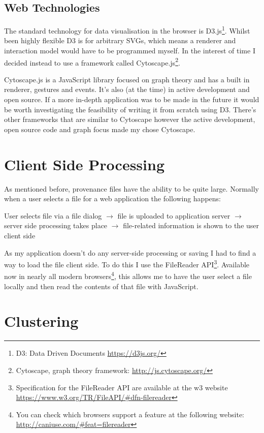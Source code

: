 \documentclass[BIT, graphvis, a4paper]{usydthesis}
\begin{document}
\subsection{Web Technologies}
\label{sub:web_technologies}

The standard technology for data visualisation in the browser is D3.js\footnote{D3: Data Driven Documents \url{https://d3js.org/}}. Whilst been highly flexible D3 is for arbitrary SVGs, which means a renderer and interaction model would have to be programmed myself. In the interest of time I decided instead to use a framework called Cytoscape.js\footnote{Cytoscape, graph theory framework: \url{http://js.cytoscape.org/}}. 

Cytoscape.js is a JavaScript library focused on graph theory and has a built in renderer, gestures and events. It's also (at the time) in active development and open source. If a more in-depth application was to be made in the future it would be worth investigating the feasibility of writing it from scratch using D3. There's other frameworks that are similar to Cytoscape however the active development, open source code and graph focus made my chose Cytoscape.

\section{Client Side Processing}
\label{sec:client_side_processing}

As mentioned before, provenance files have the ability to be quite large. Normally when a user selects a file for a web application the following happens:

User selects file via a file dialog $\rightarrow$ file is uploaded to application server $\rightarrow$ server side processing takes place $\rightarrow$ file-related information is shown to the user client side

As my application doesn't do any server-side processing or saving I had to find a way to load the file client side. To do this I use the FileReader API\footnote{Specification for the FileReader API are available at the w3 website \url{https://www.w3.org/TR/FileAPI/\#dfn-filereader}}. Available now in nearly all modern browsers\footnote{You can check which browsers support a feature at the following website: \url{http://caniuse.com/\#feat=filereader}}, this allows me to have the user select a file locally and then read the contents of that file with JavaScript.

\section{Clustering}
\label{sec:clustering}
\end{document}
